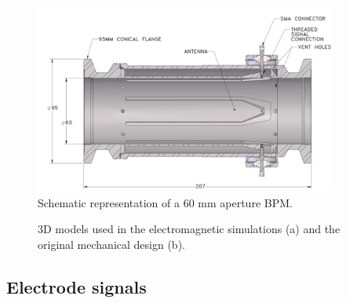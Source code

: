 \begin{figure}[ht]
\centering
\includegraphics[width=10cm,keepaspectratio]{pictures/tipp_paper}
\caption{Schematic representation of a 60 mm aperture BPM\cite{Shengli:tipp}.}
\label{STEP_tipp}
\end{figure}

\begin{figure}[ht]
\centering
{}
\hspace{3mm}
\caption{3D models used in the electromagnetic simulations (a) and the original mechanical design (b).}
\label{CSTvsSTEP_section}
\end{figure}


\subsection[Electrode signals]{Electrode signals}

